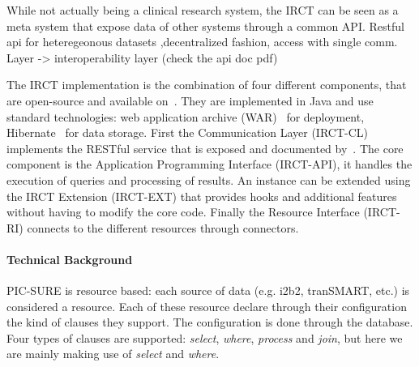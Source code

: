 While not actually being a clinical research system, the IRCT can be seen as a meta system that expose data of other systems through a common API.
Restful api for heteregeonous datasets ,decentralized fashion, access with single comm. Layer -> interoperability layer (check the api doc pdf)

The IRCT implementation is the combination of four different components, that are open-source and available on~\cite{IRCT-github}. They are implemented in Java and use standard technologies: web application archive (WAR)~\cite{wiki:war} for deployment, Hibernate~\cite{wiki:hibernate} for data storage.
First the Communication Layer (IRCT-CL) implements the RESTful service that is exposed and documented by~\cite{PIC-SURE-API}. 
The core component is the Application Programming Interface (IRCT-API), it handles the execution of queries and processing of results.
An instance can be extended using the IRCT Extension (IRCT-EXT) that provides hooks and additional features without having to modify the core code.
Finally the Resource Interface (IRCT-RI) connects to the different resources through connectors.




\paragraph{Technical Background}
PIC-SURE is resource based: each source of data (e.g. i2b2, tranSMART, etc.) is considered a resource.
Each of these resource declare through their configuration the kind of clauses they support. 
The configuration is done through the database.
Four types of clauses are supported: \emph{select}, \emph{where}, \emph{process} and \emph{join}, but here we are mainly making use of \emph{select} and \emph{where}.

